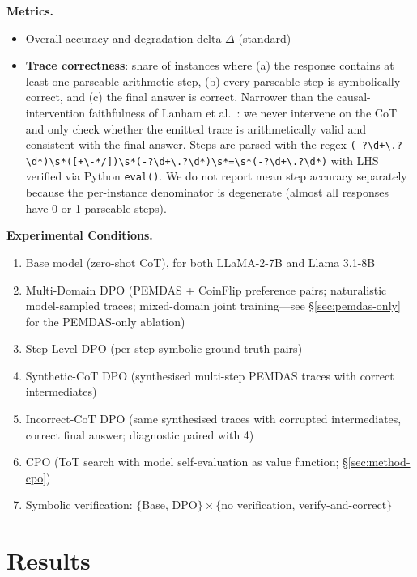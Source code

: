 \documentclass{article}
\begin{document}
\textbf{Metrics.}
\begin{itemize}
  \item Overall accuracy and degradation delta $\Delta$ (standard)
  \item \textbf{Trace correctness}: share of instances where (a) the response contains at least one parseable arithmetic step, (b) every parseable step is symbolically correct, and (c) the final answer is correct. Narrower than the causal-intervention faithfulness of Lanham et al.~\cite{lanham2023faithfulness}: we never intervene on the CoT and only check whether the emitted trace is arithmetically valid and consistent with the final answer. Steps are parsed with the regex \texttt{(-?\textbackslash d+\textbackslash .?\textbackslash d*)\textbackslash s*([+\textbackslash -*/])\textbackslash s*(-?\textbackslash d+\textbackslash .?\textbackslash d*)\textbackslash s*=\textbackslash s*(-?\textbackslash d+\textbackslash .?\textbackslash d*)} with LHS verified via Python \texttt{eval()}. We do not report mean step accuracy separately because the per-instance denominator is degenerate (almost all responses have 0 or 1 parseable steps).
\end{itemize}

\textbf{Experimental Conditions.}
\begin{enumerate}
  \item Base model (zero-shot CoT), for both LLaMA-2-7B and Llama 3.1-8B
  \item Multi-Domain DPO (PEMDAS + CoinFlip preference pairs; naturalistic model-sampled traces; mixed-domain joint training---see §\ref{sec:pemdas-only} for the PEMDAS-only ablation)
  \item Step-Level DPO (per-step symbolic ground-truth pairs)
  \item Synthetic-CoT DPO (synthesised multi-step PEMDAS traces with correct intermediates)
  \item Incorrect-CoT DPO (same synthesised traces with corrupted intermediates, correct final answer; diagnostic paired with 4)
  \item CPO (ToT search with model self-evaluation as value function; §\ref{sec:method-cpo})
  \item Symbolic verification: $\{$Base, DPO$\} \times \{$no verification, verify-and-correct$\}$
\end{enumerate}

\section{Results}
\end{document}
